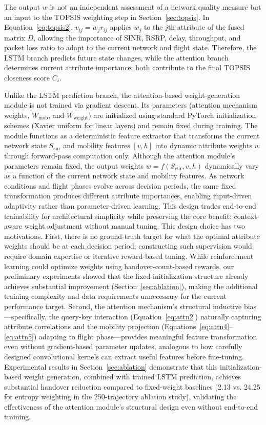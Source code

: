 \documentclass[final,3p,times,twocolumn]{elsarticle}
\begin{document}
The output $w$ is not an independent assessment of a network quality measure but an input to the TOPSIS weighting step in Section~\ref{sec:topsis}. In Equation~\eqref{eq:topsis2}, $v_{ij}=w_jr_{ij}$ applies $w_j$ to the $j$th attribute of the fused matrix $D$, allowing the importance of SINR, RSRP, delay, throughput, and packet loss ratio to adapt to the current network and flight state. Therefore, the LSTM branch predicts future state changes, while the attention branch determines current attribute importance; both contribute to the final TOPSIS closeness score $C_i$.

Unlike the LSTM prediction branch, the attention-based weight-generation module is not trained via gradient descent. Its parameters (attention mechanism weights, $W_{\mathrm{mob}}$, and $W_{\mathrm{weight}}$) are initialized using standard PyTorch initialization schemes (Xavier uniform for linear layers) and remain fixed during training. The module functions as a deterministic feature extractor that transforms the current network state $S_{\mathrm{cur}}$ and mobility features $[v,h]$ into dynamic attribute weights $w$ through forward-pass computation only. Although the attention module's parameters remain fixed, the output weights $w=f(S_{\mathrm{cur}},v,h)$ dynamically vary as a function of the current network state and mobility features. As network conditions and flight phases evolve across decision periods, the same fixed transformation produces different attribute importances, enabling input-driven adaptivity rather than parameter-driven learning. This design trades end-to-end trainability for architectural simplicity while preserving the core benefit: context-aware weight adjustment without manual tuning. This design choice has two motivations. First, there is no ground-truth target for what the optimal attribute weights should be at each decision period; constructing such supervision would require domain expertise or iterative reward-based tuning. While reinforcement learning could optimize weights using handover-count-based rewards, our preliminary experiments showed that the fixed-initialization structure already achieves substantial improvement (Section~\ref{sec:ablation}), making the additional training complexity and data requirements unnecessary for the current performance target. Second, the attention mechanism's structural inductive bias---specifically, the query-key interaction (Equation~\eqref{eq:attn2}) naturally capturing attribute correlations and the mobility projection (Equations~\eqref{eq:attn4}--\eqref{eq:attn5}) adapting to flight phase---provides meaningful feature transformation even without gradient-based parameter updates, analogous to how carefully designed convolutional kernels can extract useful features before fine-tuning. Experimental results in Section~\ref{sec:ablation} demonstrate that this initialization-based weight generation, combined with trained LSTM prediction, achieves substantial handover reduction compared to fixed-weight baselines (2.13 vs. 24.25 for entropy weighting in the 250-trajectory ablation study), validating the effectiveness of the attention module's structural design even without end-to-end training.
\end{document}
